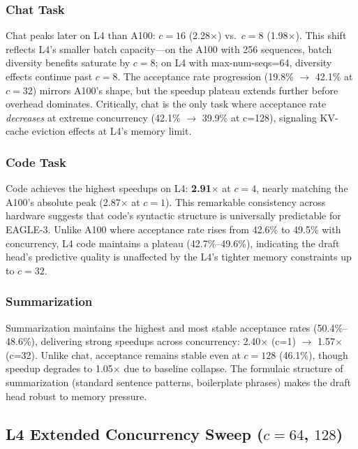 \documentclass[10pt,twocolumn]{article}
\begin{document}
\subsubsection{Chat Task}

Chat peaks later on L4 than A100: $c=16$ (2.28$\times$) vs.\ $c=8$ (1.98$\times$). This shift reflects L4's smaller batch capacity---on the A100 with 256 sequences, batch diversity benefits saturate by $c=8$; on L4 with max-num-seqs=64, diversity effects continue past $c=8$. The acceptance rate progression (19.8\% $\to$ 42.1\% at $c=32$) mirrors A100's shape, but the speedup plateau extends further before overhead dominates. Critically, chat is the only task where acceptance rate \emph{decreases} at extreme concurrency (42.1\% $\to$ 39.9\% at c=128), signaling KV-cache eviction effects at L4's memory limit.

\subsubsection{Code Task}

Code achieves the highest speedups on L4: \textbf{2.91$\times$} at $c=4$, nearly matching the A100's absolute peak (2.87$\times$ at $c=1$).  This remarkable consistency across hardware suggests that code's syntactic structure is universally predictable for EAGLE-3. Unlike A100 where acceptance rate rises from 42.6\% to 49.5\% with concurrency, L4 code maintains a plateau (42.7\%--49.6\%), indicating the draft head's predictive quality is unaffected by the L4's tighter memory constraints up to $c=32$.



\subsubsection{Summarization}

Summarization maintains the highest and most stable acceptance rates (50.4\%--48.6\%), delivering strong speedups across concurrency: 2.40$\times$ (c=1) $\to$ 1.57$\times$ (c=32). Unlike chat, acceptance remains stable even at $c=128$ (46.1\%), though speedup degrades to 1.05$\times$ due to baseline collapse. The formulaic structure of summarization (standard sentence patterns, boilerplate phrases) makes the draft head robust to memory pressure.


\subsection{L4 Extended Concurrency Sweep ($c=64$, $128$)}
\label{sec:l4_ext}
\end{document}
